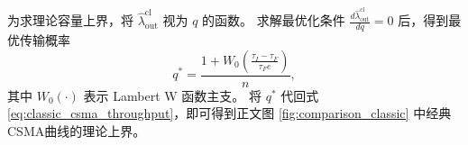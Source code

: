 为求理论容量上界，将 $\hat{\lambda}_{\text{out}}^{\text{cl}}$ 视为 $q$ 的函数。
求解最优化条件 $\frac{d\hat{\lambda}_{\text{out}}^{\text{cl}}}{dq}=0$ 后，得到最优传输概率
\begin{equation}
	\label{eq:optimal_q_classic}
	q^{*} = \frac{1 + W_{0}\left(\frac{\tau_{I}-\tau_{F}}{\tau_{F} e}\right)}{n},
\end{equation}
其中 $W_0(\cdot)$ 表示 Lambert W 函数主支\cite{2022_LambertW}。
将 $q^{*}$ 代回式 \eqref{eq:classic_csma_throughput}，即可得到正文图 \ref{fig:comparison_classic} 中经典CSMA曲线的理论上界。
